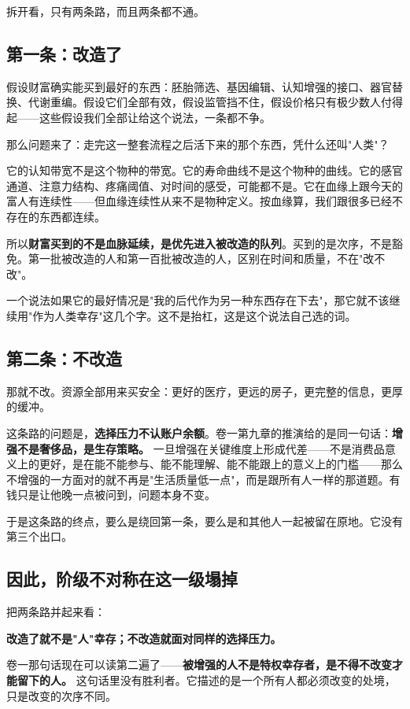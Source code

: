 \documentclass[11pt,a4paper]{ctexart}
\begin{document}
拆开看，只有两条路，而且两条都不通。

\subsection{第一条：改造了}

假设财富确实能买到最好的东西：胚胎筛选、基因编辑、认知增强的接口、器官替换、代谢重编。假设它们全部有效，假设监管挡不住，假设价格只有极少数人付得起——这些假设我们全部让给这个说法，一条都不争。

那么问题来了：走完这一整套流程之后活下来的那个东西，凭什么还叫"人类"？

它的认知带宽不是这个物种的带宽。它的寿命曲线不是这个物种的曲线。它的感官通道、注意力结构、疼痛阈值、对时间的感受，可能都不是。它在血缘上跟今天的富人有连续性——但血缘连续性从来不是物种定义。按血缘算，我们跟很多已经不存在的东西都连续。

所以\textbf{财富买到的不是血脉延续，是优先进入被改造的队列}。买到的是次序，不是豁免。第一批被改造的人和第一百批被改造的人，区别在时间和质量，不在"改不改"。

一个说法如果它的最好情况是"我的后代作为另一种东西存在下去"，那它就不该继续用"作为人类幸存"这几个字。这不是抬杠，这是这个说法自己选的词。

\subsection{第二条：不改造}

那就不改。资源全部用来买安全：更好的医疗，更远的房子，更完整的信息，更厚的缓冲。

这条路的问题是，\textbf{选择压力不认账户余额}。卷一第九章的推演给的是同一句话：\textbf{增强不是奢侈品，是生存策略。} 一旦增强在关键维度上形成代差——不是消费品意义上的更好，是在能不能参与、能不能理解、能不能跟上的意义上的门槛——那么不增强的一方面对的就不再是"生活质量低一点"，而是跟所有人一样的那道题。有钱只是让他晚一点被问到，问题本身不变。

于是这条路的终点，要么是绕回第一条，要么是和其他人一起被留在原地。它没有第三个出口。

\subsection{因此，阶级不对称在这一级塌掉}

把两条路并起来看：

\textbf{改造了就不是"人"幸存；不改造就面对同样的选择压力。}

卷一那句话现在可以读第二遍了——\textbf{被增强的人不是特权幸存者，是不得不改变才能留下的人。} 这句话里没有胜利者。它描述的是一个所有人都必须改变的处境，只是改变的次序不同。
\end{document}
